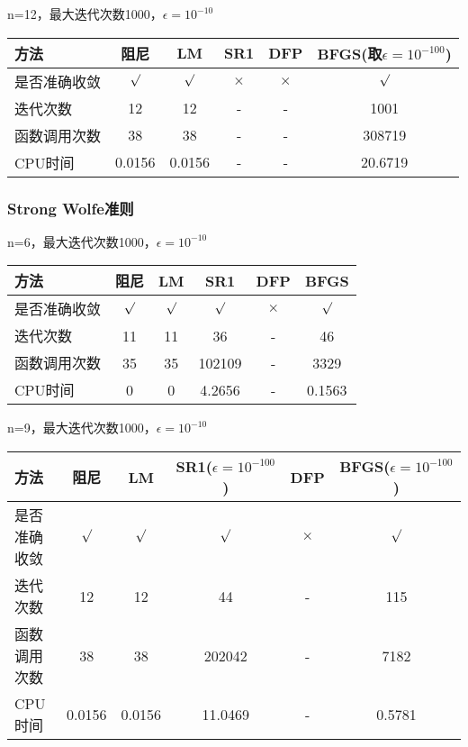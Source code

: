 \documentclass[11pt, a4paper]{article}
\begin{document}
\vspace{20pt}
n=12，最大迭代次数1000，$\epsilon=10^{-10}$

\vspace{10pt}
\begin{tabular}{|l|c|c|c|c|c|}
	\hline
	方法 & 阻尼 & LM & SR1 & DFP & BFGS(取$\epsilon=10^{-100}$) \\\hline
	是否准确收敛 & $\surd$ & $\surd$ & $\times$ & $\times$ & $\surd$ \\\hline
	迭代次数 & 12 & 12 & - & - & 1001 \\\hline
	函数调用次数 & 38 & 38 & - & - & 308719 \\\hline
	CPU时间 & 0.0156 & 0.0156 & - & - & 20.6719\\\hline
\end{tabular}

\subsubsection{Strong Wolfe准则}

n=6，最大迭代次数1000，$\epsilon=10^{-10}$

\vspace{10pt}
\begin{tabular}{|l|c|c|c|c|c|}
	\hline
	方法 & 阻尼 & LM & SR1 & DFP & BFGS \\\hline
	是否准确收敛 & $\surd$ & $\surd$ & $\surd$ & $\times$ & $\surd$ \\\hline
	迭代次数 & 11 & 11 & 36 & - & 46 \\\hline
	函数调用次数 & 35 & 35 & 102109 & - & 3329 \\\hline
	CPU时间 & 0 & 0 & 4.2656 & - & 0.1563\\\hline
\end{tabular}

\vspace{20pt}
n=9，最大迭代次数1000，$\epsilon=10^{-10}$

\vspace{10pt}
\begin{tabular}{|l|c|c|c|c|c|}
	\hline
	方法 & 阻尼 & LM & SR1($\epsilon=10^{-100}$) & DFP & BFGS($\epsilon=10^{-100}$) \\\hline
	是否准确收敛 & $\surd$ & $\surd$ & $\surd$ & $\times$ & $\surd$ \\\hline
	迭代次数 & 12 & 12 & 44 & - & 115 \\\hline
	函数调用次数 & 38 & 38 & 202042 & - & 7182 \\\hline
	CPU时间 & 0.0156 & 0.0156 & 11.0469 & - & 0.5781\\\hline
\end{tabular}
\end{document}
